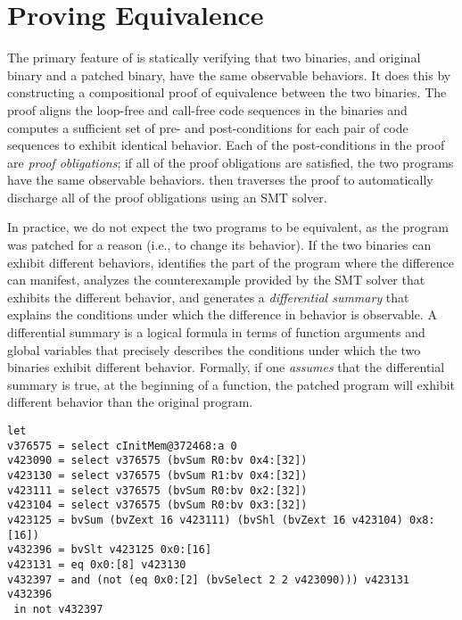 \section{Proving Equivalence}\label{sec:equivalence}

The primary feature of \TOOL{} is statically verifying that two binaries, and original binary and a patched binary, have the same observable behaviors. %
It does this by constructing a compositional proof of equivalence between the two binaries. %
The proof aligns the loop-free and call-free code sequences in the binaries and computes a sufficient set of pre- and post-conditions for each pair of code sequences to exhibit identical behavior. %
Each of the post-conditions in the proof are \emph{proof obligations}; if all of the proof obligations are satisfied, the two programs have the same observable behaviors. %
\TOOL{} then traverses the proof to automatically discharge all of the proof obligations using an SMT solver. %

In practice, we do not expect the two programs to be equivalent, as the program was patched for a reason (i.e., to change its behavior). %
If the two binaries can exhibit different behaviors, \TOOL{} identifies the part of the program where the difference can manifest, analyzes the counterexample provided by the SMT solver that exhibits the different behavior, and generates a \emph{differential summary} that explains the conditions under which the difference in behavior is observable. %
A differential summary is a logical formula in terms of function arguments and global variables that precisely describes the conditions under which the two binaries exhibit different behavior. %
Formally, if one \emph{assumes} that the differential summary is true, at the beginning of a function, the patched program will exhibit different behavior than the original program. %


\begin{lstlisting}[caption={An example differential summary}, label=fig:differential-summary]
let
v376575 = select cInitMem@372468:a 0
v423090 = select v376575 (bvSum R0:bv 0x4:[32])
v423130 = select v376575 (bvSum R1:bv 0x4:[32])
v423111 = select v376575 (bvSum R0:bv 0x2:[32])
v423104 = select v376575 (bvSum R0:bv 0x3:[32])
v423125 = bvSum (bvZext 16 v423111) (bvShl (bvZext 16 v423104) 0x8:[16])
v432396 = bvSlt v423125 0x0:[16]
v423131 = eq 0x0:[8] v423130
v432397 = and (not (eq 0x0:[2] (bvSelect 2 2 v423090))) v423131 v432396
 in not v432397
\end{lstlisting}

